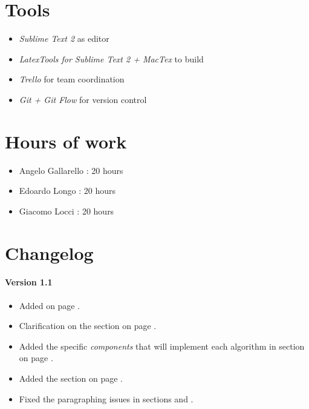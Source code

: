 \newpage
\begin{appendices}
\section{Tools}

\begin{itemize}
	\item \emph{Sublime Text 2} as editor
	\item \emph{LatexTools for Sublime Text 2 + MacTex}  to build
	\item \emph{Trello} for team coordination 
	\item \emph{Git + Git Flow} for version control 
\end{itemize}

\section{Hours of work}

\begin{itemize}
	\item Angelo Gallarello : 20 hours
	\item Edoardo Longo : 20 hours
	\item Giacomo Locci : 20 hours
\end{itemize}

\section{Changelog}
\paragraph{Version 1.1} %
\label{par:version_1_1}

\begin{itemize}
	\item Added \emph{} on page \pageref{fig:overview-diagram}.
	\item Clarification on the \emph{} section on page \pageref{ssub:data_caching}.
	\item Added the specific \emph{components} that will implement each algorithm in \emph{} section on page \pageref{sec:algorithm_design}.
	\item Added the \emph{} section on page \pageref{sec:requirements-traceability}.
	\item Fixed the paragraphing issues in sections \emph{} and \emph{}.
\end{itemize}


\end{appendices}